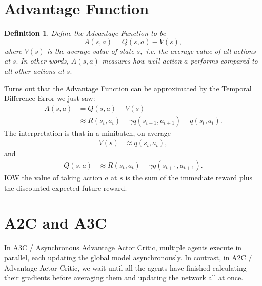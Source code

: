 \documentclass[20pt]{extarticle}
\theoremstyle{plain}
\newtheorem{definition}[theorem]{Definition}
\theoremstyle{definition}
\theoremstyle{remark}
\newcommand{\0}{\varnothing}
\newcommand{\g}{\gamma}
\newcommand{\<}{\langle}
\renewcommand{\>}{\rangle}
\begin{document}
\section{Advantage Function}

\begin{definition}
Define the Advantage Function to be \[
A(s, a) = Q(s, a) - V(s),
\]
where $ V(s) $ is the average value of state $ s, $ i.e. the average value of all actions at $ s. $ In other words, $ A(s, a) $ measures how well action $ a $ performs compared to all other actions at $ s. $
\end{definition}

Turns out that the Advantage Function can be approximated by the Temporal Difference Error we just saw: \begin{align*}
    A(s, a) &= Q(s, a) - V(s) \\
    &\approx R(s_t, a_t) + \g q(s_{t+1}, a_{t+1}) - q(s_t, a_t).
\end{align*}
The interpretation is that in a minibatch, on average \begin{align*}
    V(s) &\approx q(s_t, a_t),
\end{align*}
and
\begin{align*}
    Q(s, a) &\approx R(s_t, a_t) + \g q(s_{t+1}, a_{t+1}).
\end{align*}
IOW the value of taking action $ a $ at $ s $ is the sum of the immediate reward plus the discounted expected future reward.

\section{A2C and A3C}

In A3C / Asynchronous Advantage Actor Critic, multiple agents execute in parallel, each updating the global model asynchronously. In contrast, in A2C / Advantage Actor Critic, we wait until all the agents have finished calculating their gradients before averaging them and updating the network all at once.
\end{document}
